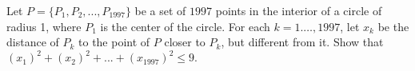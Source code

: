 Let $P = \{P_1, P_2, ..., P_{1997}\}$ be a set of $1997$ points in the interior of a circle of radius 1, where $P_1$ is the center of the circle. For each $k=1.\ldots,1997$,  let $x_k$ be the distance of $P_k$ to the point of $P$ closer to $P_k$,  but different from it. Show that $(x_1)^2 + (x_2)^2 + ... + (x_{1997})^2 \le 9.$